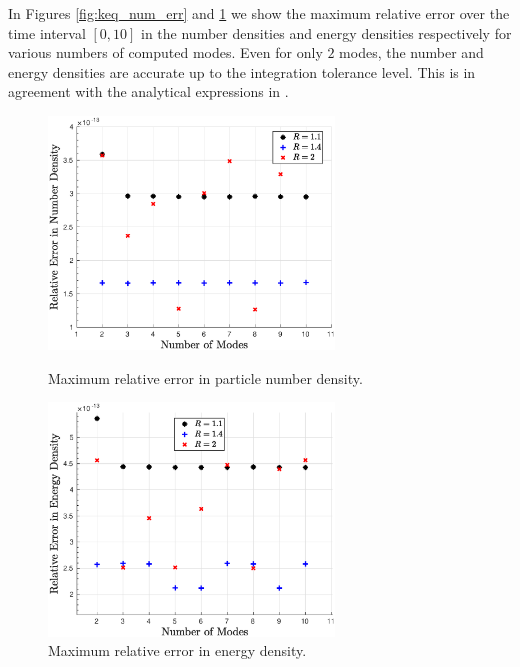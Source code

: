 In Figures \ref{fig:keq_num_err} and  \ref{fig:keq_E_err} we show the maximum relative error over the time interval $[0,10]$ in the number densities and energy densities respectively for various numbers of computed modes. Even for only $2$ modes, the number and energy densities are accurate up to the integration tolerance level.  This is in agreement with the analytical expressions in .

\begin{figure}[ht]
\begin{minipage}[b]{0.5\linewidth}
\centerline{\includegraphics[height=6.2cm]{06-appendix/SpectralMethodBoltzmann/Figures/keq_num_err.eps}}
\caption{Maximum relative error in particle number density.}\label{fig:keq_num_err}
 \end{minipage}
 \hspace{0.5cm}
 \begin{minipage}[b]{0.5\linewidth}
\centerline{\includegraphics[height=6.2cm]{06-appendix/SpectralMethodBoltzmann/Figures/keq_E_err.eps}}
\caption{Maximum relative error in energy density.}\label{fig:keq_E_err}
\end{minipage}
\end{figure}

